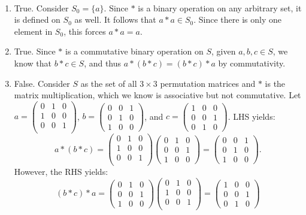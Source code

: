 \documentclass[12pt]{article}
\begin{document}
\begin{problem}[2.24]
~\begin{enumerate}[label=\alph*)]
	\item True. Consider $S_0=\{a\}$. Since $*$ is a binary operation on any arbitrary set, it is defined on  $S_0$ as well. It follows that  $a*a \in S_0$. Since there is only one element in $S_0$, this forces  $a*a=a$. 
	\item True. Since  $*$ is a commutative binary operation on $S$, given  $a,b,c \in S$, we know that $b*c \in S$, and thus $a*(b*c)=(b*c)*a$ by commutativity.
	\item False. Consider $S$ as the set of all  $3 \times 3$ permutation matrices and $*$ is the matrix multiplication, which we know is associative but not commutative. Let  $a=\begin{pmatrix} 0 & 1 & 0\\ 1 & 0 & 0\\ 0 & 0 & 1\\ \end{pmatrix} $, $b=\begin{pmatrix} 0&0&1\\0&1&0\\1&0&0 \end{pmatrix} $, and $c=\begin{pmatrix} 1&0&0\\0&0&1\\0&1&0 \end{pmatrix} $. LHS yields:
		\[
			a*(b*c) = \begin{pmatrix} 0 & 1 & 0\\ 1 & 0 & 0\\ 0 & 0 & 1\\ \end{pmatrix} \begin{pmatrix} 0&1&0\\0&0&1\\1&0&0 \end{pmatrix} = \begin{pmatrix} 0&0&1\\0&1&0\\1&0&0 \end{pmatrix}  
		.\]
	However, the RHS yields:
	\[
		(b*c)*a=  \begin{pmatrix} 0&1&0\\0&0&1\\1&0&0 \end{pmatrix} \begin{pmatrix} 0 & 1 & 0\\ 1 & 0 & 0\\ 0 & 0 & 1\\ \end{pmatrix} = \begin{pmatrix} 1&0&0\\0&0&1\\0&1&0 \end{pmatrix} 
\]
\end{enumerate}
\end{problem}
\end{document}
